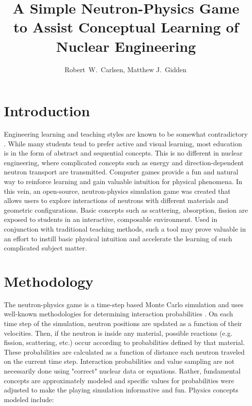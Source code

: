 \documentclass{anstrans}
\title{A Simple Neutron-Physics Game to Assist Conceptual Learning of Nuclear
  Engineering}
\author{Robert~W.~Carlsen, Matthew J.~Gidden$^{\*}$}
\institute{
University of Wisconsin, Nuclear Engineering Dept., 1500 Engineering Dr., Madison, WI
}
\begin{document}
\section{Introduction}

Engineering learning and teaching styles are known to be somewhat contradictory
\cite{felder2000learning}. While many students tend to prefer active and visual
learning, most education is in the form of abstract and sequential
concepts. This is no different in nuclear engineering, where complicated
concepts such as energy and direction-dependent neutron transport are
transmitted. Computer games provide a fun and natural way to reinforce learning
and gain valuable intuition for physical phenomena. In this vein, an
open-source, neutron-physics simulation game was created \cite{Carlsen2015} that
allows users to explore interactions of neutrons with different materials and
geometric configurations. Basic concepts such as scattering, absorption, fission
are exposed to students in an interactive, composable environment. Used in
conjunction with traditional teaching methods, such a tool may prove valuable
in an effort to instill basic physical intuition and accelerate the learning of
such complicated subject matter.

\section{Methodology}

The neutron-physics game is a time-step based Monte Carlo simulation and uses
well-known methodologies for determining interaction probabilities
\cite{lewis1984computational}. On each time step of the simulation, neutron
positions are updated as a function of their velocities.  Then, if the neutron
is inside any material, possible reactions (e.g. fission, scattering, etc.)
occur according to probabilities defined by that material.  These probabilities
are calculated as a function of distance each neutron traveled on the current
time step.  Interaction probabilities and value sampling are not necessarily
done using "correct" nuclear data or equations.  Rather, fundamental concepts
are approximately modeled and specific values for probabilities were adjusted to
make the playing simulation informative and fun.  Physics concepts modeled
include:
\end{document}

